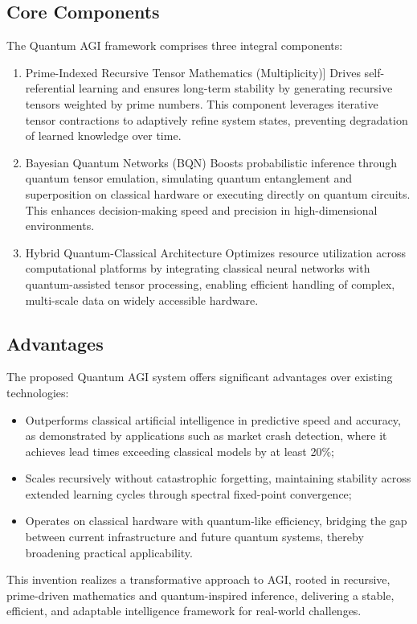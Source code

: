 \documentclass[12pt]{article}
\begin{document}
\subsection{Core Components}
The Quantum AGI framework comprises three integral components:
\begin{enumerate}
    \item{Prime-Indexed Recursive Tensor Mathematics (Multiplicity)}] Drives self-referential learning and ensures long-term stability by generating recursive tensors weighted by prime numbers. This component leverages iterative tensor contractions to adaptively refine system states, preventing degradation of learned knowledge over time.
    \item{Bayesian Quantum Networks (BQN)} Boosts probabilistic inference through quantum tensor emulation, simulating quantum entanglement and superposition on classical hardware or executing directly on quantum circuits. This enhances decision-making speed and precision in high-dimensional environments.
    \item{Hybrid Quantum-Classical Architecture} Optimizes resource utilization across computational platforms by integrating classical neural networks with quantum-assisted tensor processing, enabling efficient handling of complex, multi-scale data on widely accessible hardware.
\end{enumerate}

\subsection{Advantages}
The proposed Quantum AGI system offers significant advantages over existing technologies:
\begin{itemize}
    \item Outperforms classical artificial intelligence in predictive speed and accuracy, as demonstrated by applications such as market crash detection, where it achieves lead times exceeding classical models by at least 20\%;
    \item Scales recursively without catastrophic forgetting, maintaining stability across extended learning cycles through spectral fixed-point convergence;
    \item Operates on classical hardware with quantum-like efficiency, bridging the gap between current infrastructure and future quantum systems, thereby broadening practical applicability.
\end{itemize}

This invention realizes a transformative approach to AGI, rooted in recursive, prime-driven mathematics and quantum-inspired inference, delivering a stable, efficient, and adaptable intelligence framework for real-world challenges.
\end{document}
